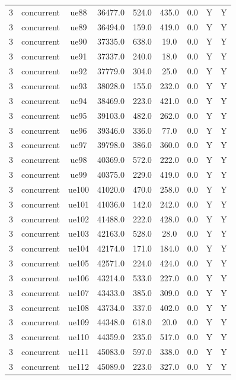 \begin{table}[ht]
\begin{tabular}{|c|c|c|c|c|c|c|c|c|}
3 & concurrent & ue88 & 36477.0 & 524.0 & 435.0 & 0.0 & Y & Y \\
3 & concurrent & ue89 & 36494.0 & 159.0 & 419.0 & 0.0 & Y & Y \\
3 & concurrent & ue90 & 37335.0 & 638.0 & 19.0 & 0.0 & Y & Y \\
3 & concurrent & ue91 & 37337.0 & 240.0 & 18.0 & 0.0 & Y & Y \\
3 & concurrent & ue92 & 37779.0 & 304.0 & 25.0 & 0.0 & Y & Y \\
3 & concurrent & ue93 & 38028.0 & 155.0 & 232.0 & 0.0 & Y & Y \\
3 & concurrent & ue94 & 38469.0 & 223.0 & 421.0 & 0.0 & Y & Y \\
3 & concurrent & ue95 & 39103.0 & 482.0 & 262.0 & 0.0 & Y & Y \\
3 & concurrent & ue96 & 39346.0 & 336.0 & 77.0 & 0.0 & Y & Y \\
3 & concurrent & ue97 & 39798.0 & 386.0 & 360.0 & 0.0 & Y & Y \\
3 & concurrent & ue98 & 40369.0 & 572.0 & 222.0 & 0.0 & Y & Y \\
3 & concurrent & ue99 & 40375.0 & 229.0 & 419.0 & 0.0 & Y & Y \\
3 & concurrent & ue100 & 41020.0 & 470.0 & 258.0 & 0.0 & Y & Y \\
3 & concurrent & ue101 & 41036.0 & 142.0 & 242.0 & 0.0 & Y & Y \\
3 & concurrent & ue102 & 41488.0 & 222.0 & 428.0 & 0.0 & Y & Y \\
3 & concurrent & ue103 & 42163.0 & 528.0 & 28.0 & 0.0 & Y & Y \\
3 & concurrent & ue104 & 42174.0 & 171.0 & 184.0 & 0.0 & Y & Y \\
3 & concurrent & ue105 & 42571.0 & 224.0 & 424.0 & 0.0 & Y & Y \\
3 & concurrent & ue106 & 43214.0 & 533.0 & 227.0 & 0.0 & Y & Y \\
3 & concurrent & ue107 & 43433.0 & 385.0 & 309.0 & 0.0 & Y & Y \\
3 & concurrent & ue108 & 43734.0 & 337.0 & 402.0 & 0.0 & Y & Y \\
3 & concurrent & ue109 & 44348.0 & 618.0 & 20.0 & 0.0 & Y & Y \\
3 & concurrent & ue110 & 44359.0 & 235.0 & 517.0 & 0.0 & Y & Y \\
3 & concurrent & ue111 & 45083.0 & 597.0 & 338.0 & 0.0 & Y & Y \\
3 & concurrent & ue112 & 45089.0 & 223.0 & 327.0 & 0.0 & Y & Y \\

\end{tabular}
\end{table}

